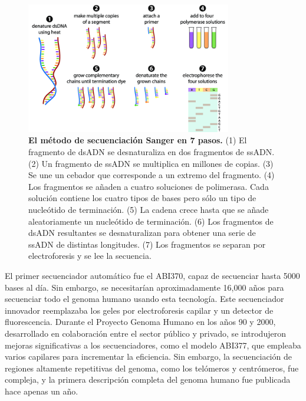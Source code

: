 \begin{figure}[htbp]
\centering
\includegraphics[width = 0.8\textwidth]{figs/sanger.png}
\caption{\textbf{El método de secuenciación Sanger en 7 pasos.} (1) El fragmento de dsADN se desnaturaliza en dos fragmentos de ssADN. (2) Un fragmento de ssADN se multiplica en millones de copias. (3) Se une un cebador que corresponde a un extremo del fragmento. (4) Los fragmentos se añaden a cuatro soluciones de polimerasa. Cada solución contiene los cuatro tipos de bases pero sólo un tipo de nucleótido de terminación. (5) La cadena crece hasta que se añade aleatoriamente un nucleótido de terminación. (6) Los fragmentos de dsADN resultantes se desnaturalizan para obtener una serie de ssADN de distintas longitudes. (7) Los fragmentos se separan por electroforesis y se lee la secuencia.}
\label{fig:Sanger}
\end{figure}

El primer secuenciador automático fue el ABI370, capaz de secuenciar hasta 5000 bases al día. Sin embargo, se necesitarían aproximadamente 16,000 años para secuenciar todo el genoma humano usando esta tecnología. Este secuenciador innovador reemplazaba los geles por electroforesis capilar y un detector de fluorescencia. Durante el Proyecto Genoma Humano en los años 90 y 2000, desarrollado en colaboración entre el sector público y privado, se introdujeron mejoras significativas a los secuenciadores, como el modelo ABI377, que empleaba varios capilares para incrementar la eficiencia. Sin embargo, la secuenciación de regiones altamente repetitivas del genoma, como los telómeros y centrómeros, fue compleja, y la primera descripción completa del genoma humano fue publicada hace apenas un año.

